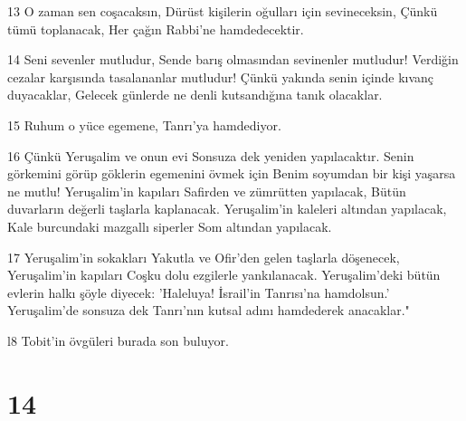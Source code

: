 \par 13 O zaman sen coşacaksın, Dürüst kişilerin oğulları için sevineceksin, Çünkü tümü toplanacak, Her çağın Rabbi'ne hamdedecektir.
\par 14 Seni sevenler mutludur, Sende barış olmasından sevinenler mutludur! Verdiğin cezalar karşısında tasalananlar mutludur! Çünkü yakında senin içinde kıvanç duyacaklar, Gelecek günlerde ne denli kutsandığına tanık olacaklar.
\par 15 Ruhum o yüce egemene, Tanrı'ya hamdediyor.
\par 16 Çünkü Yeruşalim ve onun evi Sonsuza dek yeniden yapılacaktır. Senin görkemini görüp göklerin egemenini övmek için Benim soyumdan bir kişi yaşarsa ne mutlu! Yeruşalim'in kapıları Safirden ve zümrütten yapılacak, Bütün duvarların değerli taşlarla kaplanacak. Yeruşalim'in kaleleri altından yapılacak, Kale burcundaki mazgallı siperler Som altından yapılacak.
\par 17 Yeruşalim'in sokakları Yakutla ve Ofir'den gelen taşlarla döşenecek, Yeruşalim'in kapıları Coşku dolu ezgilerle yankılanacak. Yeruşalim'deki bütün evlerin halkı şöyle diyecek: 'Haleluya! İsrail'in Tanrısı'na hamdolsun.' Yeruşalim'de sonsuza dek Tanrı'nın kutsal adını hamdederek anacaklar."
\par l8 Tobit'in övgüleri burada son buluyor.

\chapter{14}

